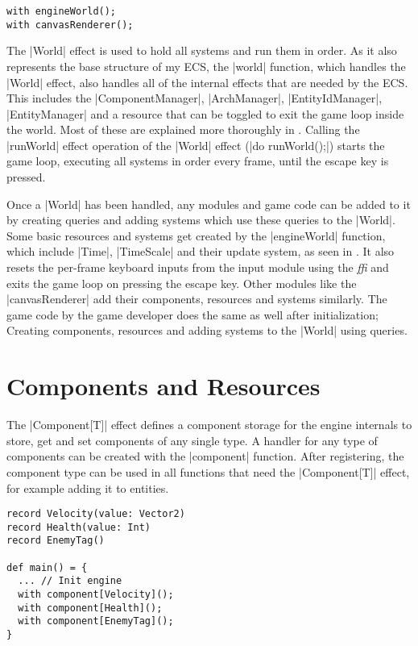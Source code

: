 \begin{lstlisting}
with engineWorld();
with canvasRenderer();
\end{lstlisting}

The |World| effect is used to hold all systems and run them in order. As it also represents the base structure of my ECS, the |world| function, which handles the |World| effect, also handles all of the internal effects that are needed by the ECS. This includes the |ComponentManager|, |ArchManager|, |EntityIdManager|, |EntityManager| and a resource that can be toggled to exit the game loop inside the world. Most of these are explained more thoroughly in . Calling the |runWorld| effect operation of the |World| effect (|do runWorld();|) starts the game loop, executing all systems in order every frame, until the escape key is pressed.

Once a |World| has been handled, any modules and game code can be added to it by creating queries and adding systems which use these queries to the |World|. Some basic resources and systems get created by the |engineWorld| function, which include |Time|, |TimeScale| and their update system, as seen in . It also resets the per-frame keyboard inputs from the input module using the \textit{ffi} and exits the game loop on pressing the escape key. Other modules like the |canvasRenderer| add their components, resources and systems similarly. The game code by the game developer does the same as well after initialization; Creating components, resources and adding systems to the |World| using queries.

\section{Components and Resources}

The |Component[T]| effect defines a component storage for the engine internals to store, get and set components of any single type. A handler for any type of components can be created with the |component| function. After registering, the component type can be used in all functions that need the |Component[T]| effect, for example adding it to entities.

\begin{lstlisting}
record Velocity(value: Vector2)
record Health(value: Int)
record EnemyTag()

def main() = {
  ... // Init engine
  with component[Velocity]();
  with component[Health]();
  with component[EnemyTag]();
}
\end{lstlisting}

